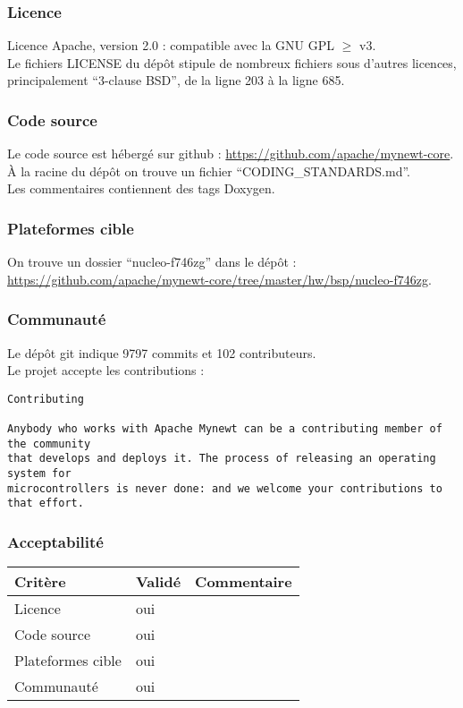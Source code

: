 \subsubsection{Licence}
Licence Apache, version 2.0 : compatible avec la GNU GPL $ \geqslant $ v3.\\

Le fichiers LICENSE du dépôt stipule de nombreux fichiers sous d'autres licences,
principalement \enquote{3-clause BSD}, de la ligne 203 à la ligne 685.

\subsubsection{Code source}
Le code source est hébergé sur github : \url{https://github.com/apache/mynewt-core}.\\

À la racine du dépôt on trouve un fichier \enquote{CODING\_STANDARDS.md}.\\

Les commentaires contiennent des tags Doxygen.

\subsubsection{Plateformes cible}
On trouve un dossier \enquote{nucleo-f746zg} dans le dépôt :
\url{https://github.com/apache/mynewt-core/tree/master/hw/bsp/nucleo-f746zg}.

\subsubsection{Communauté}
Le dépôt git indique 9797 commits et 102 contributeurs.\\

Le projet accepte les contributions :
\begin{verbatim}
Contributing

Anybody who works with Apache Mynewt can be a contributing member of the community
that develops and deploys it. The process of releasing an operating system for
microcontrollers is never done: and we welcome your contributions to that effort.
\end{verbatim}

\subsubsection{Acceptabilité}
\begin{tabular}{lll}
\toprule
	Critère				&	Validé		&	Commentaire	\\
\midrule
	Licence				&	oui			&		\\
	Code source			&	oui			&		\\
	Plateformes cible	&	oui			&		\\
	Communauté			&	oui			&		\\
\bottomrule
\end{tabular}

